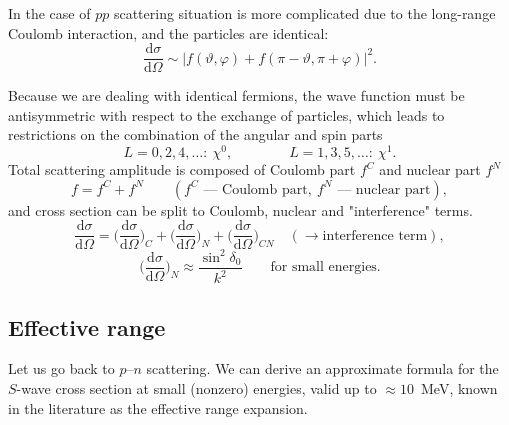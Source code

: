 \documentclass[11pt,a4paper]{article}
\newcommand{\ud}{\mathrm{d}}
\begin{document}
In the case of $pp$ scattering situation is more complicated due to the long-range Coulomb
interaction, and the particles are identical:
\[
\frac{\ud\sigma}{\ud\Omega}\sim\big|f(\vartheta,\varphi)+f(\pi-\vartheta,\pi+\varphi)\big|^2 .
\]

\begin{center}
\end{center}

Because we are dealing with identical fermions, the wave function must be antisymmetric with respect to the exchange of particles, which leads to restrictions on the combination of the angular and spin parts
\[
L=0,2,4,\dots:\ \chi^0,\qquad\qquad L=1,3,5,\dots:\ \chi^1 .
\]
Total scattering amplitude is composed of Coulomb part $f^C$ and nuclear part $f^N$
\[
f=f^C+f^N\qquad(f^C \text{ --- Coulomb part},\ f^N \text{ --- nuclear part}),
\]
and cross section can be split to Coulomb, nuclear and "interference" terms. 
\[
\frac{\ud\sigma}{\ud\Omega}=\Big(\frac{\ud\sigma}{\ud\Omega}\Big)_C
+\Big(\frac{\ud\sigma}{\ud\Omega}\Big)_N
+\Big(\frac{\ud\sigma}{\ud\Omega}\Big)_{CN}
\quad(\to \text{interference term}),
\]
\[
\Big(\frac{\ud\sigma}{\ud\Omega}\Big)_N\approx\frac{\sin^2\delta_0}{k^2}
\qquad\text{for small energies.}
\]

\subsection{Effective range}

Let us go back to $p$--$n$ scattering. We can derive an approximate formula for the $S$-wave cross section at small (nonzero) energies, valid up to $\approx10$~MeV, known in the literature as the effective range expansion. 
\end{document}
